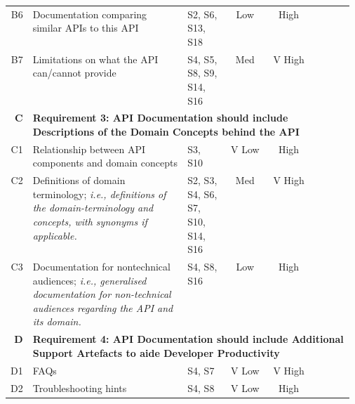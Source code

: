 {\begin{longtable}{rp{0.45\linewidth}|p{0.125\linewidth}|cc|ccc}
  B6&
  Documentation comparing similar APIs to this API
  &
  \scriptsize S2, S6, S13, S18 &
  \cellcolor[HTML]{f6b26b}Low&\cellcolor[HTML]{a7c47d}High&\circlepartialpresent{}&\circlenotpresent{}&\circlepresent{}\\


  B7&
  Limitations on what the API can/cannot provide
  &
  \scriptsize S4, S5, S8, S9, S14, S16 &
  \cellcolor[HTML]{ffd666}Med&\cellcolor[HTML]{57bb8a}V High&\circlenotpresent{}&\circlepresent{}&\circlepresent{}\\

  \midrule
  \textbf{C}&
  \multicolumn{7}{l}{\textbf{Requirement 3: API Documentation should include Descriptions of the Domain Concepts behind the API}}\\
  \midrule
  
  C1&
  Relationship between API components and domain concepts
  &
  \scriptsize S3, S10 &
  \cellcolor[HTML]{e67c73}V Low&\cellcolor[HTML]{a7c47d}High&\circlenotpresent{}&\circlenotpresent{}&\circlepresent{}\\

  C2&
  Definitions of domain terminology; \textit{i.e., definitions of the domain-terminology and concepts, with synonyms if applicable.}
  &
  \scriptsize S2, S3, S4, S6, S7, S10, S14, S16 &
  \cellcolor[HTML]{ffd666}Med&\cellcolor[HTML]{57bb8a}V High&\circlepartialpresent{}&\circlenotpresent{}&\circlepartialpresent{}\\

  C3&
  Documentation for nontechnical audiences; \textit{i.e., generalised documentation for non-technical audiences regarding the API and its domain.}
  &
  \scriptsize S4, S8, S16 &
  \cellcolor[HTML]{f6b26b}Low&\cellcolor[HTML]{a7c47d}High&\circlepresent{}&\circlepresent{}&\circlepresent{}\\

  \midrule
  \textbf{D}&
  \multicolumn{7}{l}{\textbf{Requirement 4: API Documentation should include Additional Support Artefacts to aide Developer Productivity}}\\
  \midrule
  
  D1&
  FAQs
  &
  \scriptsize S4, S7 &
  \cellcolor[HTML]{e67c73}V Low&\cellcolor[HTML]{57bb8a}V High&\circlepresent{}&\circlepresent{}&\circlepresent{}\\

  D2&
  Troubleshooting hints
  &
  \scriptsize S4, S8 &
  \cellcolor[HTML]{e67c73}V Low&\cellcolor[HTML]{a7c47d}High&\circlenotpresent{}&\circlepartialpresent{}&\circlenotpresent{}\\


\end{longtable}}
